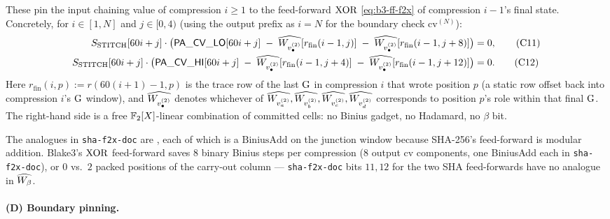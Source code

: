 These pin the input chaining value of compression $i \ge 1$ to the
feed-forward $\operatorname{XOR}$ \eqref{eq:b3-ff-f2x} of compression $i-1$'s final
state. Concretely, for $i \in [1, N]$ and $j \in [0, 4)$ (using the
output prefix as $i = N$ for the boundary check
$\mathrm{cv}^{(N)}$):
\begin{align}
S_{\mathrm{STITCH}}[60i + j] \cdot \bigl(
   \mathsf{PA\_CV\_LO}[60i + j]
   \;-\; \widehat{W_{v_\bullet^{(2)}}}[r_\mathrm{fin}(i-1, j)]
   \;-\; \widehat{W_{v_\bullet^{(2)}}}[r_\mathrm{fin}(i-1, j+8)]
\bigr) &= 0, \tag{C11}\label{con:b3-stitch-lo}\\
S_{\mathrm{STITCH}}[60i + j] \cdot \bigl(
   \mathsf{PA\_CV\_HI}[60i + j]
   \;-\; \widehat{W_{v_\bullet^{(2)}}}[r_\mathrm{fin}(i-1, j+4)]
   \;-\; \widehat{W_{v_\bullet^{(2)}}}[r_\mathrm{fin}(i-1, j+12)]
\bigr) &= 0. \tag{C12}\label{con:b3-stitch-hi}
\end{align}
Here $r_\mathrm{fin}(i, p) := r(60(i+1)-1, p)$ is the trace row of
the last $\operatorname{G}$ in compression $i$ that wrote position $p$ (a static
row offset back into compression $i$'s $\operatorname{G}$ window), and
$\widehat{W_{v_\bullet^{(2)}}}$ denotes whichever of
$\widehat{W_{v_a^{(2)}}}, \widehat{W_{v_b^{(2)}}}, \widehat{W_{v_c^{(2)}}},
\widehat{W_{v_d^{(2)}}}$ corresponds to position $p$'s role within that
final $\operatorname{G}$. The right-hand side is a free $\mathbb{F}_2[X]$-linear
combination of committed cells: no Binius gadget, no Hadamard, no
$\beta$ bit.

\begin{remark}
\label{rem:b3-ff-savings}
The analogues in \texttt{sha-f2x-doc} are
, each of which is a $\mathrm{BiniusAdd}$ on
the junction window because SHA-256's feed-forward is modular
addition. Blake3's $\operatorname{XOR}$ feed-forward saves $8$ binary Binius steps
per compression ($8$ output cv components, one BiniusAdd each in
\texttt{sha-f2x-doc}), or $0$ vs.\ $2$ packed positions of the
carry-out column — \texttt{sha-f2x-doc} bits $11, 12$ for the two SHA
feed-forwards have no analogue in $\widehat{W_\beta}$.
\end{remark}


\paragraph{(D) Boundary pinning.}

